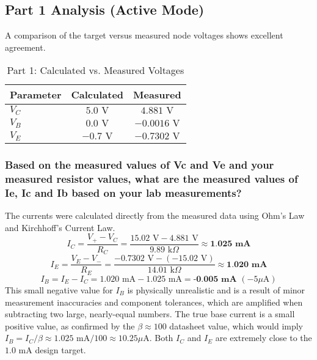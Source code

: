 \subsection*{Part 1 Analysis (Active Mode)}
A comparison of the target versus measured node voltages shows excellent agreement.
\begin{table}[H]
\centering
\caption{Part 1: Calculated vs. Measured Voltages}
\begin{tabular}{|l|c|c|}
\hline
\textbf{Parameter} & \textbf{Calculated} & \textbf{Measured} \\ \hline
\textbf{$V_C$} & $5.0 \text{ V}$ & $4.881 \text{ V}$ \\ \hline
\textbf{$V_B$} & $0.0 \text{ V}$ & $-0.0016 \text{ V}$ \\ \hline
\textbf{$V_E$} & $-0.7 \text{ V}$ & $-0.7302 \text{ V}$ \\ \hline
\end{tabular}
\end{table}

\subsubsection*{Based on the measured values of Vc and Ve and your measured resistor values, what are the measured values of Ie, Ic and Ib based on your lab measurements?}
The currents were calculated directly from the measured data using Ohm's Law and Kirchhoff's Current Law.
\[ I_C = \frac{V_+ - V_C}{R_C} = \frac{15.02 \text{ V} - 4.881 \text{ V}}{9.89 \text{ k}\Omega} \approx \textbf{1.025 mA} \]
\[ I_E = \frac{V_E - V_-}{R_E} = \frac{-0.7302 \text{ V} - (-15.02 \text{ V})}{14.01 \text{ k}\Omega} \approx \textbf{1.020 mA} \]
\[ I_B = I_E - I_C = 1.020 \text{ mA} - 1.025 \text{ mA} = \textbf{-0.005 mA } (-5 \mu\text{A}) \]
This small negative value for $I_B$ is physically unrealistic and is a result of minor measurement inaccuracies and component tolerances, which are amplified when subtracting two large, nearly-equal numbers. The true base current is a small positive value, as confirmed by the $\beta \approx 100$ datasheet value, which would imply $I_B = I_C / \beta \approx 1.025 \text{ mA} / 100 \approx 10.25 \mu\text{A}$. Both $I_C$ and $I_E$ are extremely close to the $1.0 \text{ mA}$ design target.


